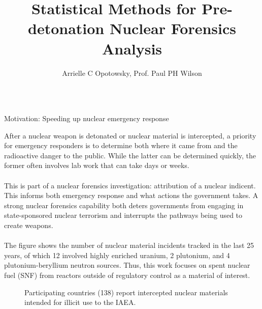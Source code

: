 \documentclass{beamer}
\title[small title]{\texorpdfstring{Statistical Methods for Pre-detonation Nuclear Forensics Analysis}
{Statistical Methods for Pre-detonation Nuclear Forensics Analysis}}
\author{Arrielle C Opotowsky, Prof. Paul PH Wilson}
\institute{University of Wisconsin-Madison}
\begin{document}
\small

\begin{frame}[t]{}
\begin{columns}

\begin{column}[T]{0.27\textwidth}
\begin{block}{Motivation: Speeding up nuclear emergency response}

After a nuclear weapon is detonated or nuclear material is intercepted, a
priority for emergency responders is to determine both where it came from and
the radioactive danger to the public. While the latter can be determined
quickly, the former often involves lab work that can take days or weeks. \\~\\

This is part of a nuclear forensics investigation: attribution of a nuclear
indicent. This informs both emergency response and what actions the government
takes.  A strong nuclear forensics capability both deters governments from
engaging in state-sponsored nuclear terrorism and interrupts the pathways being
used to create weapons. \\~\\

The figure shows the number of nuclear material incidents tracked in
the last 25 years, of which 12 involved highly enriched uranium, 2 plutonium,
and 4 plutonium-beryllium neutron sources.  Thus, this work focuses on spent
nuclear fuel (SNF) from reactors outside of regulatory control as a material of
interest. 

\begin{figure}
  \fboxsep=1mm
  \fboxrule=3pt
  \caption{Participating countries (138) report intercepted nuclear materials
           intended for illicit use to the IAEA.\cite{trafficking}}
  \label{fig:itdb}
\end{figure}



\end{block}
\end{column}
\end{columns}
\end{frame}
\end{document}
